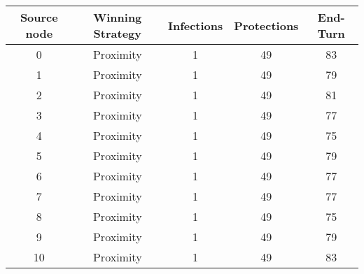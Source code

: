 \documentclass[results.tex]{subfiles}
\begin{document}
    \begin{center}
        \begin{tabular}{| c || c | c | c | c |}
            \hline
            {\bfseries Source node} & {\bfseries Winning Strategy} & {\bfseries Infections} & {\bfseries Protections}
            & {\bfseries End-Turn}
            \\  %
            \hline\hline
            0                       & Proximity                    & 1                      & 49                      & 83                   \\
            \hline
            1                       & Proximity                    & 1                      & 49                      & 79                   \\
            \hline
            2                       & Proximity                    & 1                      & 49                      & 81                   \\
            \hline
            3                       & Proximity                    & 1                      & 49                      & 77                   \\
            \hline
            4                       & Proximity                    & 1                      & 49                      & 75                   \\
            \hline
            5                       & Proximity                    & 1                      & 49                      & 79                   \\
            \hline
            6                       & Proximity                    & 1                      & 49                      & 77                   \\
            \hline
            7                       & Proximity                    & 1                      & 49                      & 77                   \\
            \hline
            8                       & Proximity                    & 1                      & 49                      & 75                   \\
            \hline
            9                       & Proximity                    & 1                      & 49                      & 79                   \\
            \hline
            10                      & Proximity                    & 1                      & 49                      & 83                   \\

\end{tabular}
\end{center}
\end{document}
